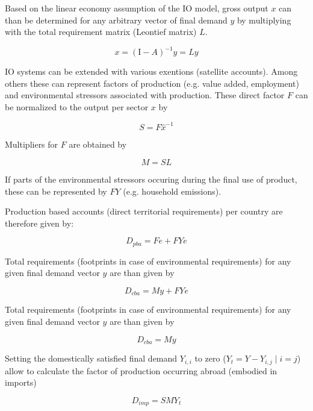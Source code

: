 \documentclass{jors}
\begin{document}
{Based on the linear economy assumption of the IO model, gross output $x$ can than be determined for any arbitrary vector of final demand $y$ by multiplying with the total requirement matrix (Leontief matrix) $L$.

\begin{equation}
    x = (\mathrm{I}- A)^{-1}y = Ly
\end{equation}


IO systems can be extended with various exentions (satellite accounts).
Among others these can represent factors of production (e.g. value added, employment)
and environmental stressors associated with production.
These direct factor $F$ can be normalized to the output per sector $x$ by

\begin{equation}
    S = F\hat{x}^{-1}
\end{equation}

Multipliers for $F$ are obtained by

\begin{equation}
    M = SL
\end{equation}

If parts of the environmental stressors occuring during the final use of product,
these can be represented by $FY$ (e.g. household emissions).

Production based accounts (direct territorial requirements) per country are therefore given by:

\begin{equation}
    D_{pba} = Fe + FYe
\end{equation}

Total requirements (footprints in case of environmental requirements) for any
given final demand vector $y$ are than given by

\begin{equation}
    D_{cba} = My + FYe
\end{equation}


Total requirements (footprints in case of environmental requirements) for any
given final demand vector $y$ are than given by 

\begin{equation}
    D_{cba} = My
\end{equation}

Setting the domestically satisfied final demand $Y_{i,i}$ to zero ($Y_{t} = Y -
Y_{i,j}\; |\; i = j$) allow to calculate the factor of production occurring
abroad (embodied in imports)

\begin{equation}
    D_{imp} = SMY_{t}
\end{equation}

}
\end{document}
